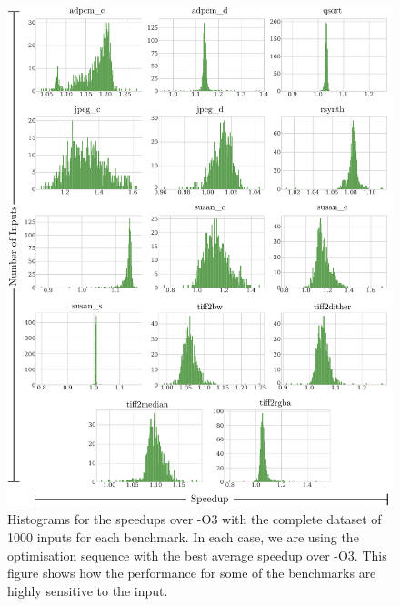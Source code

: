 \begin{figure}[h!]
    \centering
    \includegraphics[width=\textwidth]{figs/speedups-per-input.pdf}
    \caption{Histograms for the speedups over {\flagstype -O3} with the complete dataset of 1000 inputs for each benchmark.
             In each case, we are using the optimisation sequence with the best average speedup over {\flagstype -O3}.
             This figure shows how the performance for some of the benchmarks are highly sensitive to the input.}
    \label{fig:speedups-per-input}
\end{figure}



